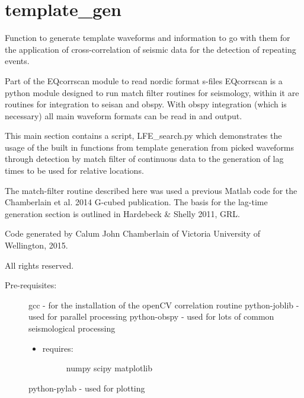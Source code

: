 \documentclass[a4paper,10pt,english]{sphinxmanual}
\begin{document}
\section{template\_gen}
\label{modules:template-gen}\label{modules:module-template_gen}
Function to generate template waveforms and information to go with them for the
application of cross-correlation of seismic data for the detection of repeating
events.

Part of the EQcorrscan module to read nordic format s-files
EQcorrscan is a python module designed to run match filter routines for
seismology, within it are routines for integration to seisan and obspy.
With obspy integration (which is necessary) all main waveform formats can be
read in and output.

This main section contains a script, LFE\_search.py which demonstrates the usage
of the built in functions from template generation from picked waveforms
through detection by match filter of continuous data to the generation of lag
times to be used for relative locations.

The match-filter routine described here was used a previous Matlab code for the
Chamberlain et al. 2014 G-cubed publication.  The basis for the lag-time
generation section is outlined in Hardebeck \& Shelly 2011, GRL.

Code generated by Calum John Chamberlain of Victoria University of Wellington,
2015.

All rights reserved.
\begin{description}
\item[{Pre-requisites:}] \leavevmode
gcc             - for the installation of the openCV correlation routine
python-joblib   - used for parallel processing
python-obspy    - used for lots of common seismological processing
\begin{itemize}
\item {} \begin{description}
\item[{requires:}] \leavevmode
numpy
scipy
matplotlib

\end{description}

\end{itemize}

python-pylab    - used for plotting

\end{description}
\end{document}
